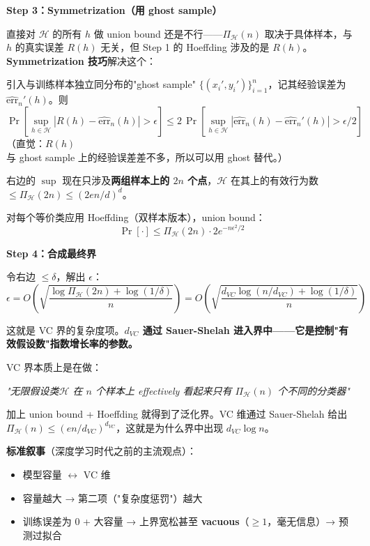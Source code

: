 \documentclass[12pt, a4paper]{ctexart}
\begin{document}
\begin{blackboard}[VC 界的三步证明]
\textbf{Step 3：Symmetrization（用 ghost sample）}

直接对 $\mathcal{H}$ 的所有 $h$ 做 union bound 还是不行——$\Pi_{\mathcal{H}}(n)$ 取决于具体样本，与 $h$ 的真实误差 $R(h)$ 无关，但 Step 1 的 Hoeffding 涉及的是 $R(h)$。\textbf{Symmetrization 技巧}解决这个：

引入与训练样本独立同分布的"ghost sample" $\{(x_i', y_i')\}_{i=1}^n$，记其经验误差为 $\widehat{\mathrm{err}}_n'(h)$。则
\[
\Pr\!\left[\sup_{h \in \mathcal{H}} |R(h) - \widehat{\mathrm{err}}_n(h)| > \epsilon\right] \leq 2\,\Pr\!\left[\sup_{h \in \mathcal{H}} |\widehat{\mathrm{err}}_n(h) - \widehat{\mathrm{err}}_n'(h)| > \epsilon/2\right]
\]
（直觉：$R(h)$ 与 ghost sample 上的经验误差差不多，所以可以用 ghost 替代。）

右边的 $\sup$ 现在只涉及\textbf{两组样本上的 $2n$ 个点}，$\mathcal{H}$ 在其上的有效行为数 $\leq \Pi_{\mathcal{H}}(2n) \leq (2en/d)^d$。

对每个等价类应用 Hoeffding（双样本版本），union bound：
\[
\Pr[\cdot] \leq \Pi_{\mathcal{H}}(2n) \cdot 2e^{-n\epsilon^2/2}
\]

\textbf{Step 4：合成最终界}

令右边 $\leq \delta$，解出 $\epsilon$：
\[
\epsilon = O\!\left(\sqrt{\frac{\log \Pi_{\mathcal{H}}(2n) + \log(1/\delta)}{n}}\right) = O\!\left(\sqrt{\frac{d_{VC}\log(n/d_{VC}) + \log(1/\delta)}{n}}\right)
\]

这就是 VC 界的复杂度项。\textbf{$d_{VC}$ 通过 Sauer-Shelah 进入界中——它是控制"有效假设数"指数增长率的参数。}

\end{blackboard}

\begin{insight}[VC 界的本质]
VC 界本质上是在做：

\textit{"无限假设类$\mathcal{H}$ 在 $n$ 个样本上 effectively 看起来只有 $\Pi_{\mathcal{H}}(n)$ 个不同的分类器"}

加上 union bound + Hoeffding 就得到了泛化界。VC 维通过 Sauer-Shelah 给出 $\Pi_{\mathcal{H}}(n) \leq (en/d_{VC})^{d_{VC}}$，这就是为什么界中出现 $d_{VC} \log n$。
\end{insight}

\textbf{标准叙事}（深度学习时代之前的主流观点）：
\begin{itemize}
    \item 模型容量 $\leftrightarrow$ VC 维
    \item 容量越大 → 第二项（"复杂度惩罚"）越大
    \item 训练误差为 0 + 大容量 → 上界宽松甚至 \textbf{vacuous}（$\geq 1$，毫无信息）→ 预测过拟合
\end{itemize}
\end{document}
